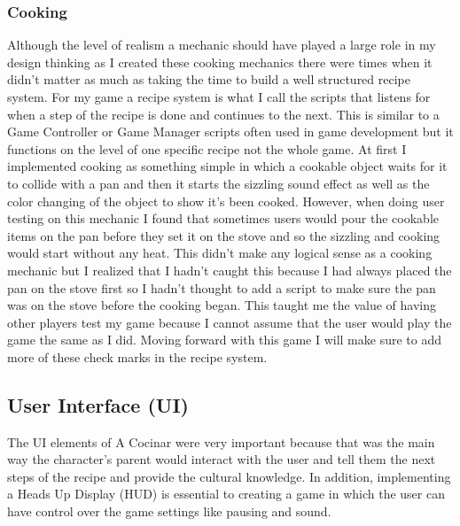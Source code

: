 \documentclass[10pt,twocolumn]{article}
\begin{document}
\subsubsection{Cooking}
Although the level of realism a mechanic should have played a large role in my design thinking as I created these cooking mechanics there were times when it didn’t matter as much as taking the time to build a well structured recipe system. For my game a recipe system is what I call the scripts that listens for when a step of the recipe is done and continues to the next. This is similar to a Game Controller or Game Manager scripts often used in game development but it functions on the level of one specific recipe not the whole game\cite{gameManager2021}. At first I implemented cooking as something simple in which a cookable object waits for it to collide with a pan and then it starts the sizzling sound effect as well as the color changing of the object to show it’s been cooked. However, when doing user testing on this mechanic I found that sometimes users would pour the cookable items on the pan before they set it on the stove and so the sizzling and cooking would start without any heat. This didn’t make any logical sense as a cooking mechanic but I realized that I hadn’t caught this because I had always placed the pan on the stove first so I hadn’t thought to add a script to make sure the pan was on the stove before the cooking began. This taught me the value of having other players test my game because I cannot assume that the user would play the game the same as I did. Moving forward with this game I will make sure to add more of these check marks in the recipe system. 

\subsection{User Interface (UI)}
The UI elements of A Cocinar were very important because that was the main way the character’s parent would interact with the user and tell them the next steps of the recipe and provide the cultural knowledge. In addition, implementing a Heads Up Display (HUD) is essential to creating a game in which the user can have control over the game settings like pausing and sound.  
\end{document}
